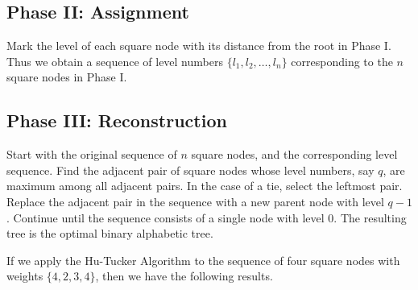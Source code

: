 \documentclass[12pt]{article}
\begin{document}
\subsection*{Phase II: Assignment}

Mark the level of each square node with its distance from the root in Phase I.
Thus we obtain a sequence of level numbers $\{l_1, l_2,\ldots, l_n\}$ corresponding
to the $n$ square nodes in Phase I.

\subsection*{Phase III: Reconstruction}

Start with the original sequence of $n$ square nodes, and the corresponding level
sequence.  Find the adjacent pair of square nodes whose level numbers, say $q$,
are maximum among all adjacent pairs. In the case of a tie, select the leftmost
pair. Replace the adjacent pair in the sequence with a new parent node with level
$q-1$. Continue until the sequence consists of a single node with level $0$. The
resulting tree is the optimal binary alphabetic tree.
\vspace{1em}
\par

If we apply the Hu-Tucker Algorithm to the sequence of four square nodes with
weights $\{ 4, 2, 3, 4\}$, then we have the following results.
\end{document}
